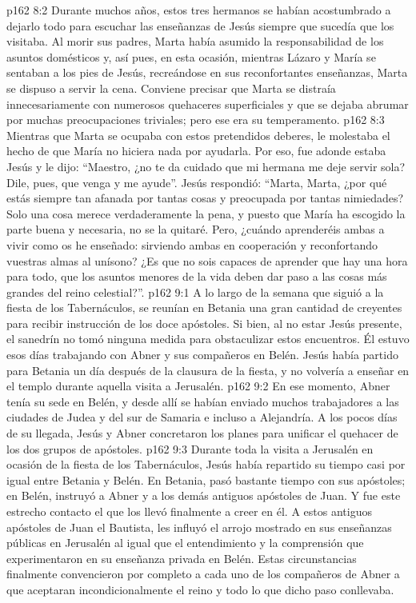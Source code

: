 \vs p162 8:2 Durante muchos años, estos tres hermanos se habían acostumbrado a dejarlo todo para escuchar las enseñanzas de Jesús siempre que sucedía que los visitaba. Al morir sus padres, Marta había asumido la responsabilidad de los asuntos domésticos y, así pues, en esta ocasión, mientras Lázaro y María se sentaban a los pies de Jesús, recreándose en sus reconfortantes enseñanzas, Marta se dispuso a servir la cena. Conviene precisar que Marta se distraía innecesariamente con numerosos quehaceres superficiales y que se dejaba abrumar por muchas preocupaciones triviales; pero ese era su temperamento.
\vs p162 8:3 Mientras que Marta se ocupaba con estos pretendidos deberes, le molestaba el hecho de que María no hiciera nada por ayudarla. Por eso, fue adonde estaba Jesús y le dijo: “Maestro, ¿no te da cuidado que mi hermana me deje servir sola? Dile, pues, que venga y me ayude”. Jesús respondió: “Marta, Marta, ¿por qué estás siempre tan afanada por tantas cosas y preocupada por tantas nimiedades? Solo una cosa merece verdaderamente la pena, y puesto que María ha escogido la parte buena y necesaria, no se la quitaré. Pero, ¿cuándo aprenderéis ambas a vivir como os he enseñado: sirviendo ambas en cooperación y reconfortando vuestras almas al unísono? ¿Es que no sois capaces de aprender que hay una hora para todo, que los asuntos menores de la vida deben dar paso a las cosas más grandes del reino celestial?”.
\vs p162 9:1 A lo largo de la semana que siguió a la fiesta de los Tabernáculos, se reunían en Betania una gran cantidad de creyentes para recibir instrucción de los doce apóstoles. Si bien, al no estar Jesús presente, el sanedrín no tomó ninguna medida para obstaculizar estos encuentros. Él estuvo esos días trabajando con Abner y sus compañeros en Belén. Jesús había partido para Betania un día después de la clausura de la fiesta, y no volvería a enseñar en el templo durante aquella visita a Jerusalén.
\vs p162 9:2 \pc En ese momento, Abner tenía su sede en Belén, y desde allí se habían enviado muchos trabajadores a las ciudades de Judea y del sur de Samaria e incluso a Alejandría. A los pocos días de su llegada, Jesús y Abner concretaron los planes para unificar el quehacer de los dos grupos de apóstoles.
\vs p162 9:3 Durante toda la visita a Jerusalén en ocasión de la fiesta de los Tabernáculos, Jesús había repartido su tiempo casi por igual entre Betania y Belén. En Betania, pasó bastante tiempo con sus apóstoles; en Belén, instruyó a Abner y a los demás antiguos apóstoles de Juan. Y fue este estrecho contacto el que los llevó finalmente a creer en él. A estos antiguos apóstoles de Juan el Bautista, les influyó el arrojo mostrado en sus enseñanzas públicas en Jerusalén al igual que el entendimiento y la comprensión que experimentaron en su enseñanza privada en Belén. Estas circunstancias finalmente convencieron por completo a cada uno de los compañeros de Abner a que aceptaran incondicionalmente el reino y todo lo que dicho paso conllevaba.

